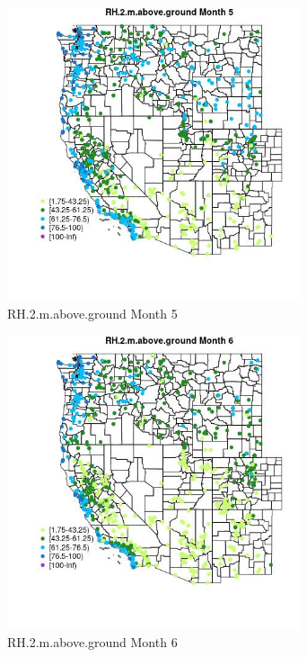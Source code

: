 \begin{figure} 
\centering  
\includegraphics[width=0.77\textwidth]{Code_Outputs/Report_ML_input_PM25_Step4_part_f_de_duplicated_aves_prioritize_24hr_obswNAs_MapObsMo5RH2maboveground.jpg} 
\caption{\label{fig:Report_ML_input_PM25_Step4_part_f_de_duplicated_aves_prioritize_24hr_obswNAsMapObsMo5RH2maboveground}RH.2.m.above.ground Month 5} 
\end{figure} 
 

\clearpage 

\begin{figure} 
\centering  
\includegraphics[width=0.77\textwidth]{Code_Outputs/Report_ML_input_PM25_Step4_part_f_de_duplicated_aves_prioritize_24hr_obswNAs_MapObsMo6RH2maboveground.jpg} 
\caption{\label{fig:Report_ML_input_PM25_Step4_part_f_de_duplicated_aves_prioritize_24hr_obswNAsMapObsMo6RH2maboveground}RH.2.m.above.ground Month 6} 
\end{figure} 
 

